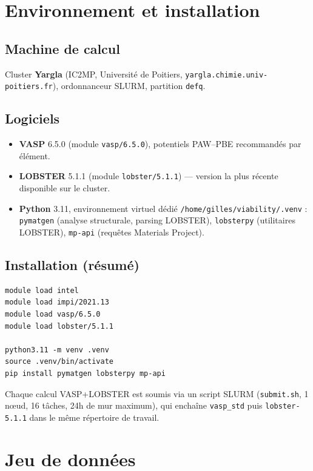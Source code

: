 \documentclass[11pt,a4paper]{article}
\begin{document}
\section{Environnement et installation}

\subsection{Machine de calcul}

Cluster \textbf{Yargla} (IC2MP, Université de Poitiers,
\texttt{yargla.chimie.univ-poitiers.fr}), ordonnanceur SLURM, partition
\texttt{defq}.

\subsection{Logiciels}

\begin{itemize}
  \item \textbf{VASP} 6.5.0 (module \texttt{vasp/6.5.0}), potentiels
    PAW--PBE recommandés par élément.
  \item \textbf{LOBSTER} 5.1.1 (module \texttt{lobster/5.1.1}) --- version la
    plus récente disponible sur le cluster.
  \item \textbf{Python} 3.11, environnement virtuel dédié
    \texttt{/home/gilles/viability/.venv} :
    \texttt{pymatgen} (analyse structurale, parsing LOBSTER),
    \texttt{lobsterpy} (utilitaires LOBSTER),
    \texttt{mp-api} (requêtes Materials Project).
\end{itemize}

\subsection{Installation (résumé)}

\begin{lstlisting}
module load intel
module load impi/2021.13
module load vasp/6.5.0
module load lobster/5.1.1

python3.11 -m venv .venv
source .venv/bin/activate
pip install pymatgen lobsterpy mp-api
\end{lstlisting}

Chaque calcul VASP+LOBSTER est soumis via un script SLURM
(\texttt{submit.sh}, 1 n\oe ud, 16 t\^aches, 24h de mur maximum), qui
enchaîne \texttt{vasp\_std} puis \texttt{lobster-5.1.1} dans le même
répertoire de travail.

\section{Jeu de données}
\end{document}

